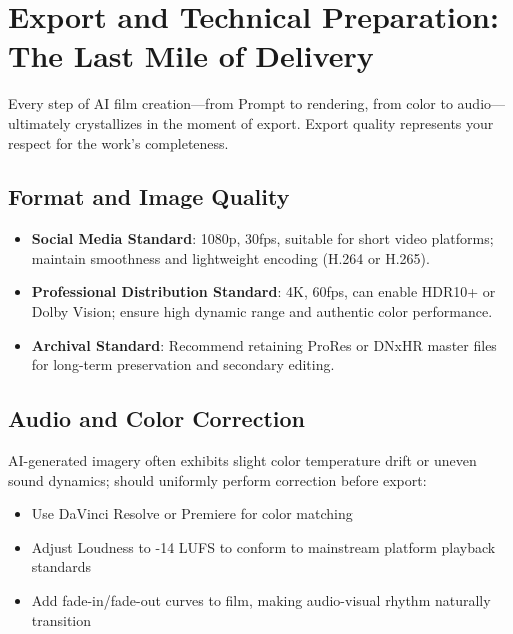 \section{Export and Technical Preparation: The Last Mile of Delivery}
\label{sec:export-preparation}

Every step of AI film creation—from Prompt to rendering, from color to audio—ultimately crystallizes in the moment of export. Export quality represents your respect for the work's completeness.

\subsection{Format and Image Quality}

\begin{itemize}
\item \textbf{Social Media Standard}: 1080p, 30fps, suitable for short video platforms; maintain smoothness and lightweight encoding (H.264 or H.265).

\item \textbf{Professional Distribution Standard}: 4K, 60fps, can enable HDR10+ or Dolby Vision; ensure high dynamic range and authentic color performance.

\item \textbf{Archival Standard}: Recommend retaining ProRes or DNxHR master files for long-term preservation and secondary editing.
\end{itemize}

\subsection{Audio and Color Correction}

AI-generated imagery often exhibits slight color temperature drift or uneven sound dynamics; should uniformly perform correction before export:

\begin{itemize}
\item Use DaVinci Resolve or Premiere for color matching
\item Adjust Loudness to -14 LUFS to conform to mainstream platform playback standards
\item Add fade-in/fade-out curves to film, making audio-visual rhythm naturally transition
\end{itemize}

